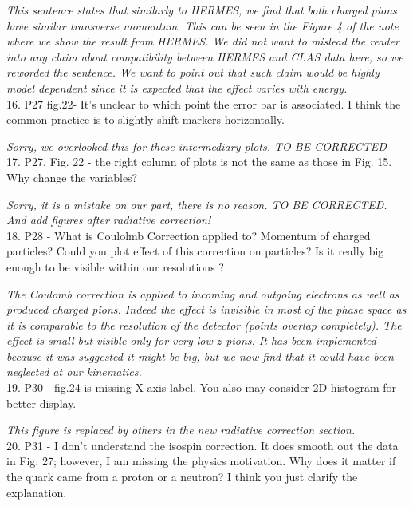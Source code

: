 \documentclass[12pt]{article}
\begin{document}
{\it This sentence states that similarly to HERMES, we find that both charged pions have similar
transverse momentum. This can be seen in the Figure 4 of the note where we show the result from 
HERMES. We did not want to mislead the reader into any claim about compatibility between 
HERMES and CLAS data here, so we reworded the sentence. We want to point out that such claim 
would be highly model dependent since it is expected that the effect varies with energy. } \\


16.
P27 fig.22-
 It's unclear to which point the error bar is associated. I think the common 
practice is to slightly shift markers horizontally.

{\it Sorry, we overlooked this for these intermediary plots. TO BE CORRECTED} \\

17.
P27, Fig. 22 - the right column of plots is not the same as those in Fig. 15.  Why change the 
variables?

{\it Sorry, it is a mistake on our part, there is no reason. TO BE CORRECTED. And
add figures after radiative correction!} \\



18.
P28 - What is Coulolmb Correction applied to? Momentum of charged particles? Could you 
plot effect of this correction on particles? Is it really big enough to be visible within our 
resolutions ?

{\it The Coulomb correction is applied to incoming and outgoing electrons as well as
produced charged pions. Indeed the effect is invisible in most of the phase space as
it is comparable to the resolution of the detector (points overlap completely). The 
effect is small but visible only for very low $z$ pions. It has been implemented 
because it was suggested it might be big, but we now find that it could have been 
neglected at our kinematics.} \\


19.
P30 - 
fig.24 is missing X axis label. You also may consider 2D histogram for better display.

{\it This figure is replaced by others in the new radiative correction section.} \\


20.
P31 - I don’t understand the isospin correction.  It does smooth out the data in Fig. 27; 
however, I am missing the physics motivation.  Why does it matter if the quark came from a 
proton or a neutron?  I think you just clarify the explanation.
\end{document}
